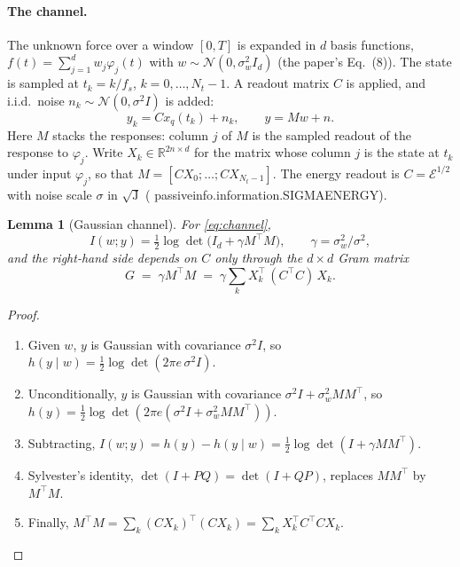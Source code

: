 \documentclass[11pt]{article}
\newtheorem{lemma}[theorem]{Lemma}
\theoremstyle{definition}
\theoremstyle{remark}
\newcommand{\R}{\mathbb{R}}
\newcommand{\Em}{\mathcal{E}}         %
\newcommand{\codeus}{\textunderscore\allowbreak}
\newcommand{\code}[1]{{\ttfamily\let\_\codeus\hyphenchar\font=-1 #1}}
\begin{document}
\paragraph{The channel.} The unknown force over a window $[0,T]$ is expanded in $d$ basis
functions, $f(t)=\sum_{j=1}^d w_j\varphi_j(t)$ with $w\sim\mathcal N(0,\sigma_w^2I_d)$
(the paper's Eq.~(8)). The state is sampled at $t_k=k/f_s$, $k=0,\dots,N_t-1$. A readout
matrix $C$ is applied, and i.i.d.\ noise $n_k\sim\mathcal N(0,\sigma^2 I)$ is added:
\begin{equation}\label{eq:channel}
  y_k = C x_q(t_k) + n_k,\qquad y = Mw + n .
\end{equation}
Here $M$ stacks the responses: column $j$ of $M$ is the sampled readout of the response to
$\varphi_j$. Write $X_k\in\R^{2n\times d}$ for the matrix whose column $j$ is the state at
$t_k$ under input $\varphi_j$, so that $M=[CX_0;\dots;CX_{N_t-1}]$. The energy readout is
$C=\Em^{1/2}$ with noise scale $\sigma$ in $\sqrt{\mathrm J}$
(\code{passive\_info.information.SIGMA\_ENERGY}).

\begin{lemma}[Gaussian channel]\label{lem:gauss}
For \eqref{eq:channel},
\[
  I(w;y)=\tfrac12\log\det\!\big(I_d+\gamma M^\top M\big),\qquad \gamma=\sigma_w^2/\sigma^2 ,
\]
and the right-hand side depends on $C$ only through the $d\times d$ \emph{Gram matrix}
\begin{equation}\label{eq:gram}
  G \;=\; \gamma M^\top M \;=\; \gamma\sum_{k} X_k^\top\,(C^\top C)\,X_k .
\end{equation}
\end{lemma}
\begin{proof}
\begin{enumerate}[nosep]
  \item Given $w$, $y$ is Gaussian with covariance $\sigma^2I$, so
        $h(y\mid w)=\frac12\log\det(2\pi e\,\sigma^2 I)$.
  \item Unconditionally, $y$ is Gaussian with covariance $\sigma^2I+\sigma_w^2MM^\top$, so
        $h(y)=\frac12\log\det(2\pi e(\sigma^2I+\sigma_w^2MM^\top))$.
  \item Subtracting, $I(w;y)=h(y)-h(y\mid w)=\frac12\log\det(I+\gamma MM^\top)$.
  \item Sylvester's identity, $\det(I+PQ)=\det(I+QP)$, replaces $MM^\top$ by $M^\top M$.
  \item Finally, $M^\top M=\sum_k (CX_k)^\top(CX_k)=\sum_kX_k^\top C^\top CX_k$.
\end{enumerate}
\end{proof}
\end{document}
